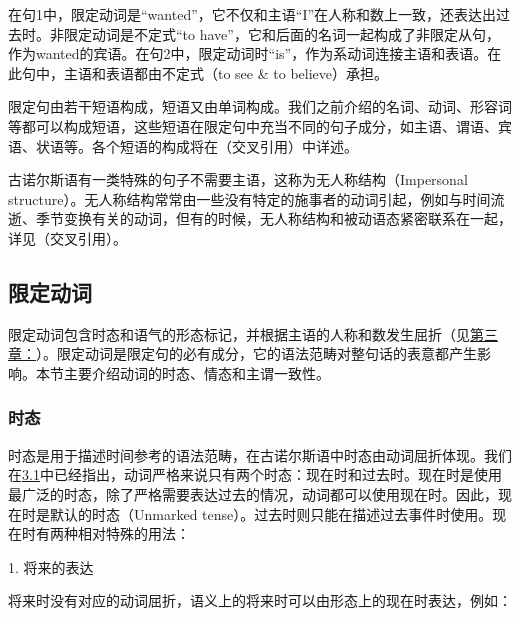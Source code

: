 在句1中，限定动词是``wanted''，它不仅和主语``I''在人称和数上一致，还表达出过去时。非限定动词是不定式``to
have''，它和后面的名词一起构成了非限定从句，作为wanted的宾语。在句2中，限定动词时``is''，作为系动词连接主语和表语。在此句中，主语和表语都由不定式（to
see \& to believe）承担。

限定句由若干短语构成，短语又由单词构成。我们之前介绍的名词、动词、形容词等都可以构成短语，这些短语在限定句中充当不同的句子成分，如主语、谓语、宾语、状语等。各个短语的构成将在（交叉引用）中详述。

古诺尔斯语有一类特殊的句子不需要主语，这称为无人称结构（Impersonal
structure）。无人称结构常常由一些没有特定的施事者的动词引起，例如与时间流逝、季节变换有关的动词，但有的时候，无人称结构和被动语态紧密联系在一起，详见（交叉引用）。

\subsection{限定动词}\label{ux9650ux5b9aux52a8ux8bcd}

限定动词包含时态和语气的形态标记，并根据主语的人称和数发生屈折（见\hyperref[ux52a8ux8bcdux4e0eux53d8ux4f4dux6cd5]{第三章：}）。限定动词是限定句的必有成分，它的语法范畴对整句话的表意都产生影响。本节主要介绍动词的时态、情态和主谓一致性。

\subsubsection{时态}\label{ux65f6ux6001}

时态是用于描述时间参考的语法范畴，在古诺尔斯语中时态由动词屈折体现。我们在\hyperref[ux52a8ux8bcdux7684ux6982ux8ff0]{3.1}中已经指出，动词严格来说只有两个时态：现在时和过去时。现在时是使用最广泛的时态，除了严格需要表达过去的情况，动词都可以使用现在时。因此，现在时是默认的时态（Unmarked
tense）。过去时则只能在描述过去事件时使用。现在时有两种相对特殊的用法：

1. 将来的表达

将来时没有对应的动词屈折，语义上的将来时可以由形态上的现在时表达，例如：

